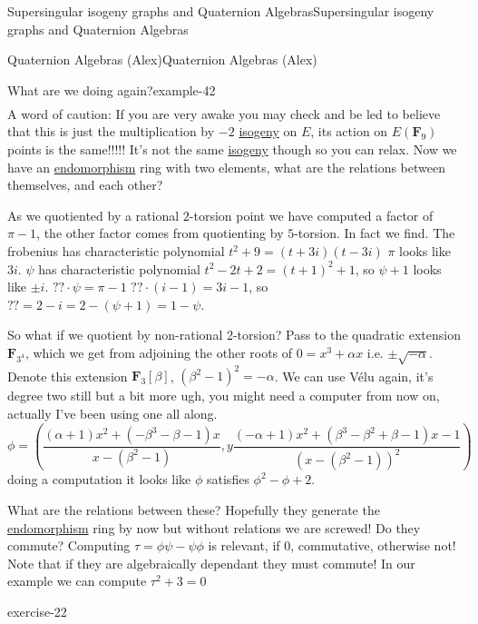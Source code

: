 \documentclass[10pt,]{book}
\numberwithin{equation}{section}
\newcommand{\lb}{[}
\newcommand{\rb}{]}
\newcommand{\FF}{\mathbf{F}}
\begin{document}
\begin{chapterptx}{Supersingular isogeny graphs and Quaternion Algebras}{}{Supersingular isogeny graphs and Quaternion Algebras}{}{}
\begin{sectionptx}{Quaternion Algebras (Alex)}{}{Quaternion Algebras (Alex)}{}{}
\begin{introduction}{}
\begin{example}{What are we doing again?}{example-42}
\begin{gather*}
\end{gather*}
A word of caution: If you are very awake you may check and be led to believe that this is just the multiplication by \(-2\) \hyperref[def-supersing-isog-isog]{isogeny} on \(E\), its action on \(E(\FF_9)\) points is the same!!!!! It's not the same \hyperref[def-supersing-isog-isog]{isogeny} though so you can relax. Now we have an \hyperref[def-supersing-isog-endo]{endomorphism} ring with two elements, what are the relations between themselves, and each other?%
\par
\hypertarget{p-874}{}%
As we quotiented by a rational \(2\)-torsion point we have computed a factor of \(\pi - 1\), the other factor comes from quotienting by \(5\)-torsion. In fact we find. The frobenius has characteristic polynomial \(t^2 + 9 = (t + 3i)(t-3i)\) \(\pi\) looks like \(3i\). \(\psi\) has characteristic polynomial \(t^2 - 2t + 2 = (t+1)^2 + 1\), so \(\psi + 1\) looks like \(\pm i\). \(?? \cdot \psi = \pi - 1\)  \(?? \cdot (i - 1) = 3i - 1\), so \(?? = 2 - i = 2 - (\psi + 1) = 1 - \psi\).%
\par
\hypertarget{p-875}{}%
So what if we quotient by non-rational 2-torsion? Pass to the quadratic extension \(\FF_{3^4}\), which we get from adjoining the other roots of \(0 = x^3 + \alpha x\) i.e. \(\pm \sqrt{-\alpha}\). Denote this extension \(\FF_3 \lb \beta \rb\),  \((\beta^2 - 1)^2 = -\alpha\). We can use Vélu again, it's degree two still but a bit more ugh, you might need a computer from now on, actually I've been using one all along.%
\begin{equation*}
\phi = \left( \frac{\left(\alpha + 1\right) x^{2} + \left(- \beta^{3}  -  \beta - 1\right) x}{x -   (\beta^{2} - 1)},y \frac{\left(-\alpha + 1\right) x^{2} + \left(\beta^{3}  -  \beta^{2} + \beta - 1\right) x -  1}{(x -  ( \beta^{2} - 1))^2} \right)
\end{equation*}
doing a computation it looks like \(\phi\) satisfies \(\phi^2 -\phi + 2\).%
\par
\hypertarget{p-876}{}%
What are the relations between these? Hopefully they generate the \hyperref[def-supersing-isog-endo]{endomorphism} ring by now but without relations we are screwed! Do they commute? Computing \(\tau = \phi \psi  - \psi \phi\) is relevant, if 0, commutative, otherwise not! Note that if they are algebraically dependant they must commute! In our example we can compute \(\tau^2 + 3 = 0\)%
\end{example}
\begin{inlineexercise}{}{exercise-22}%
\hypertarget{p-877}{}%

\end{inlineexercise}
\end{introduction}
\end{sectionptx}
\end{chapterptx}
\end{document}
